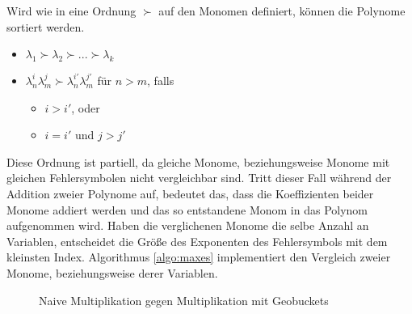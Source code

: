 Wird wie in \cite{geobuckets} eine Ordnung $\succ$ auf den Monomen definiert, können die Polynome sortiert werden.
\begin{itemize}
    \label{def:order}
    \item $\lambda_1 \succ \lambda_2 \succ...\succ \lambda_k $
    \item $\lambda_n^i \lambda_m^j \succ \lambda_n^{i'} \lambda_m^{j'} $ für $n > m$, falls
    \begin{itemize}
        \item[] $ i > i'$, oder
        \item[] $ i = i'$ und $ j > j'$
    \end{itemize}
\end{itemize}
Diese Ordnung ist partiell, da gleiche Monome, beziehungsweise Monome mit gleichen Fehlersymbolen nicht vergleichbar sind. Tritt dieser Fall während der Addition zweier Polynome auf, bedeutet das, dass die Koeffizienten beider Monome addiert werden und das so entstandene Monom in das Polynom aufgenommen wird.
Haben die verglichenen Monome die selbe Anzahl an Variablen, entscheidet die Größe des Exponenten des Fehlersymbols mit dem kleinsten Index. Algorithmus \ref{algo:maxes} implementiert den Vergleich zweier Monome, beziehungsweise derer Variablen.

\begin{figure}[ht]
    \centering
    \caption{Naive Multiplikation gegen Multiplikation mit Geobuckets}
    \label{fig:my_label}
\end{figure}



